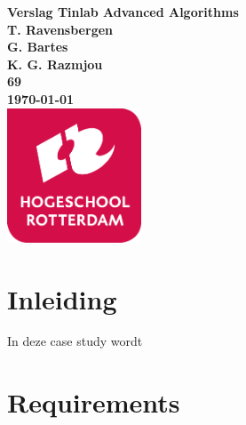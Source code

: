 \documentclass{article}
\begin{document}
	\sffamily
	\begin{titlepage}
		\centering
		\vfill
		{\bfseries\Huge
			Verslag Tinlab Advanced Algorithms \\
			\vskip2cm
		}
		{\bfseries\Large
			T. Ravensbergen\\ 
			G. Bartes\\
			K. G. Razmjou\\
		}
		{
			\bfseries\normalsize
			69\\
			\vskip1cm
			\today\\
		}    
		\vfill
		\includegraphics[width=4cm]{logohr.png} %
		\vfill
		\vfill
	\end{titlepage}
	\newpage
	\tableofcontents
	
	\newpage
	\section{Inleiding}
	In deze case study wordt %
	
	\section{Requirements}
	
\end{document}
